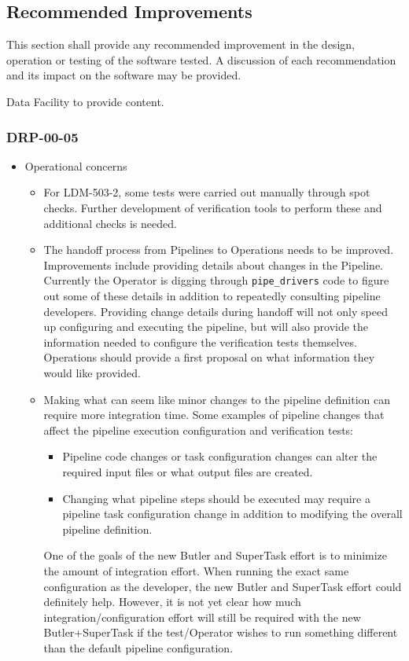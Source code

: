 \documentclass[DM,lsstdraft,STR,toc]{lsstdoc}
\begin{document}
\subsection{Recommended Improvements \label{sect:recommendations}}
This section shall provide any recommended improvement in the design, operation or testing of the software tested. A discussion
of each recommendation and its impact on the software may be provided.

\begin{note}
Data Facility to provide content.
\end{note}

\subsubsection{DRP-00-05}
\begin{itemize}
\item Operational concerns
\begin{itemize}
  \item For LDM-503-2, some tests were carried out manually through 
  spot checks.  Further development of verification tools to perform
  these and additional checks is needed.
  \item The handoff process from Pipelines to Operations needs to
  be improved.  Improvements include providing details about changes
  in the Pipeline.   Currently the Operator is digging through
  \texttt{pipe{\_}drivers} code to figure out some of these details 
  in addition to repeatedly consulting pipeline developers.
  Providing change details during handoff will not only
  speed up configuring and executing the pipeline, but will also
  provide the information needed to configure the verification tests
  themselves.  Operations should provide a first proposal on what
  information they would like provided.

  \item Making what can seem like minor changes to the pipeline
  definition can require more integration time.  Some examples of 
  pipeline changes that affect the pipeline 
  execution configuration and verification tests:
  \begin{itemize}
  \item Pipeline code changes or task configuration changes can alter the
      required input files or what output files are created.  
  \item Changing what pipeline steps should be executed 
      may require a pipeline task configuration change in
      addition to modifying the overall pipeline definition.
  \end{itemize}
  One of the goals of the new Butler and SuperTask effort is
  to minimize the amount of integration effort. When running 
  the exact same configuration as the developer, the new 
  Butler and SuperTask effort could 
  definitely help.   However, it is not yet clear how much
  integration/configuration effort will still be required with the
  new Butler+SuperTask if the test/Operator wishes to run 
  something different than the default pipeline configuration.


\end{itemize}
\end{itemize}
\end{document}
